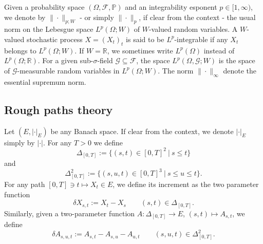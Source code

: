 \documentclass[11pt,a4paper]{article}
\newcommand{\R}{\mathbb{R}}
\theoremstyle{plain}
\begin{document}
Given a probability space $(\Omega,\mathcal{F},\mathbb{P})$ and an integrability esponent $p\in [1,\infty)$, we denote by $\|\cdot\|_{p;W}$ - or simply $\|\cdot\|_p$, if clear from the context - the usual norm on the Lebesgue space $L^p(\Omega;W)$ of $W$-valued random variables. A $W$-valued stochastic process $X=(X_t)_t$ is said to be $L^p$-integrable if any $X_t$ belongs to $L^p(\Omega;W)$. If $W=\R$, we sometimes write $L^p(\Omega)$ instead of $L^p(\Omega;\R)$. For a given sub-$\sigma$-field $\mathcal{G}\subseteq \mathcal{F}$, the space $L^p(\Omega,\mathcal{G};W)$ is the space of $\mathcal{G}$-measurable random variables in $L^p(\Omega;W)$.
The norm $\|\cdot\|_\infty$ denote the essential supremum norm. 

\subsection{Rough paths theory}
Let $(E,|\cdot|_E)$ be any Banach space. If clear from the context, we denote $|\cdot|_E$ simply by $|\cdot|$.
For any $T>0$ we define \begin{equation*}
    \Delta_{[0,T]} := \{ (s,t) \in [0,T]^2 \ | \ s\le t\}
\end{equation*} and \begin{equation*}
    \Delta^2_{[0,T]} := \{ (s,u,t) \in [0,T]^3 \ | \ s\le u \le t\}. 
\end{equation*}
For any path $[0,T]\ni t \mapsto X_t \in E$, we define its increment as the two parameter function
\begin{equation*}
    \delta X_{s,t} := X_t - X_s \qquad (s,t) \in \Delta_{[0,T]}.
\end{equation*}
Similarly, given a two-parameter function  $A:\Delta_{[0,T]} \to E$, $(s,t) \mapsto A_{s,t}$, we define \begin{equation*}
    \delta A_{s,u,t}:= A_{s,t} - A_{s,u} - A_{u,t} \qquad (s,u,t) \in \Delta_{[0,T]}^2. 
\end{equation*}
\end{document}
